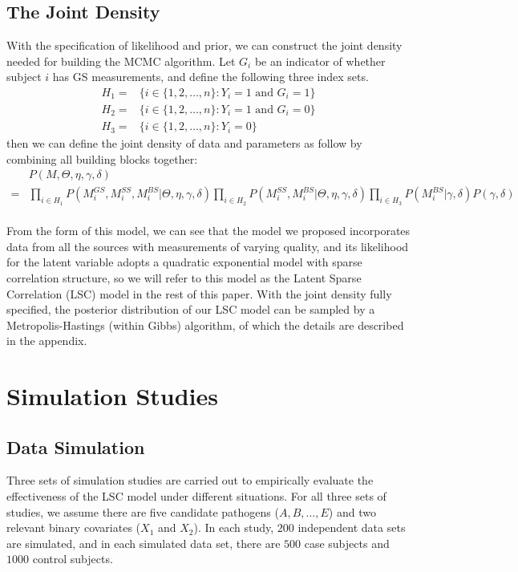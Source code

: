 \documentclass[11 pt, a4paper]{article}  %
\begin{document}
\subsection{The Joint Density}
With the specification of likelihood and prior, we can construct the joint density needed for building the MCMC algorithm. Let $G_i$ be an indicator of whether subject $i$ has GS measurements, and define the following three index sets.
\begin{align*}
H_1 = & \Big \{i \in \{1,2,\ldots, n\}: Y_i=1 \text{ and } G_i=1 \Big\}\\
H_2 = & \Big \{i \in \{1,2,\ldots, n\}: Y_i=1 \text{ and } G_i=0 \Big\}\\
H_3 = & \Big \{i \in \{1,2,\ldots, n\}: Y_i=0 \Big\}
\end{align*}
then we can define the joint density of data and parameters as follow by combining all building blocks together:
\begin{align*}
& P(M,\Theta, \eta, \gamma, \delta) \\
= & \prod_{i\in H_1} P(M_i^{GS},M_i^{SS},M_i^{BS} | \Theta, \eta, \gamma, \delta) 
\prod_{i\in H_2} P(M_i^{SS},M_i^{BS} |\Theta, \eta, \gamma, \delta)
\prod_{i\in H_3} P(M_i^{BS} |\gamma, \delta) P(\gamma, \delta)
\end{align*}
\\
From the form of this model, we can see that the model we proposed incorporates data from all the sources with measurements of varying quality, and its likelihood for the latent variable adopts a quadratic exponential model with sparse correlation structure, so we will refer to this model as the Latent Sparse Correlation (LSC) model in the rest of this paper. With the joint density fully specified, the posterior distribution of our LSC model can be sampled by a Metropolis-Hastings (within Gibbs) algorithm, of which the details are described in the appendix.


\newpage
\section{Simulation Studies}
\subsection{Data Simulation}
Three sets of simulation studies are carried out to empirically evaluate the effectiveness of the LSC model under different situations. For all three sets of studies, we assume there are five candidate pathogens ($A, B, \ldots, E$) and two relevant binary covariates ($X_1$ and $X_2$). In each study, $200$ independent data sets are simulated, and in each simulated data set, there are $500$ case subjects and $1000$ control subjects.\\
\end{document}
